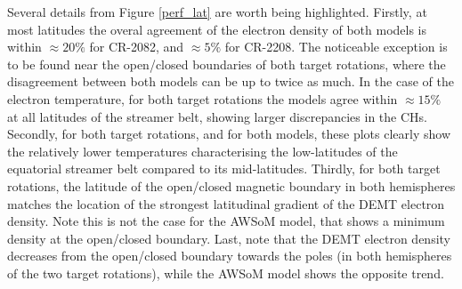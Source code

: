 \documentclass[namedreferences]{solarphysics}
\begin{document}
\begin{article}
{{Several details from Figure \ref{perf_lat} are worth being highlighted. Firstly, at most latitudes the overal agreement of the electron density of both models is within $\approx 20\%$ for CR-2082, and $\approx 5\%$ for CR-2208. The noticeable exception is to be found near the open/closed boundaries of both target rotations, where the disagreement between both models can be up to twice as much. In the case of the electron temperature, for both target rotations the models agree within $\approx 15\%$ at all latitudes of the streamer belt, showing larger discrepancies in the CHs.} Secondly, for both target rotations, and for both models, these plots clearly show the relatively lower temperatures characterising the low-latitudes of the equatorial streamer belt compared to its mid-latitudes. Thirdly, for both target rotations, the latitude of the open/closed magnetic boundary in both hemispheres matches the location of the strongest latitudinal gradient of the DEMT electron density. Note this is not the case for the AWSoM model, that shows a minimum density at the open/closed boundary. Last, note that the DEMT electron density decreases from the open/closed boundary towards the poles (in both hemispheres of the two target rotations), while the AWSoM model shows the opposite trend.}


\end{article}
\end{document}
